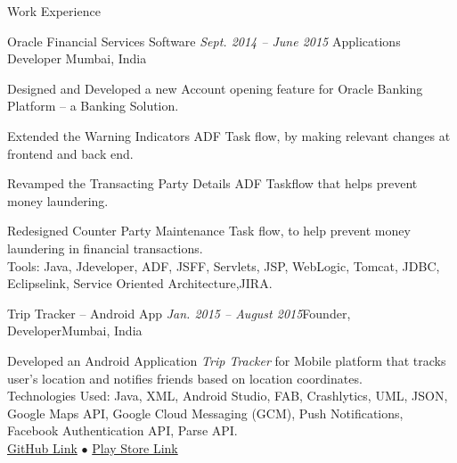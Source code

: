 \documentclass{resume} %
\begin{document}

\begin{rSection}{Work Experience}

\begin{rSubsection}{Oracle Financial Services Software} {\emph{Sept. 2014 -- June 2015}} {Applications Developer}
{Mumbai, India}

\item Designed and Developed a new Account opening feature for Oracle Banking Platform -- a Banking Solution.
\item Extended the Warning Indicators ADF Task flow, by making relevant changes at frontend and back end.
\item Revamped the Transacting Party Details ADF Taskflow that helps prevent money laundering.
\item Redesigned Counter Party Maintenance Task flow, to help prevent money laundering in financial transactions. \\
Tools: Java, Jdeveloper, ADF, JSFF, Servlets, JSP, WebLogic, Tomcat, JDBC, Eclipselink, Service Oriented Architecture,JIRA.

\end{rSubsection}


\begin{rSubsection}{Trip Tracker -- Android App}{\emph{ Jan. 2015 -- August 2015}}{Founder, Developer}{Mumbai, India}
\item Developed an Android Application {\emph{Trip Tracker}}  for Mobile platform that tracks user's  location and notifies friends based on location coordinates. \\
Technologies Used: Java, XML, Android Studio, FAB, Crashlytics, UML, JSON, Google Maps API, Google Cloud Messaging (GCM), Push Notifications, Facebook Authentication API, Parse API. \\
\href{https://github.com/sahil2441/Trip-Tracker}{GitHub Link}
{\tiny$\bullet$}
\href{https://play.google.com/store/apps/details?id=me.sahiljain.tripTracker}{Play Store Link}
\end{rSubsection}

\end{rSection}
\end{document}
